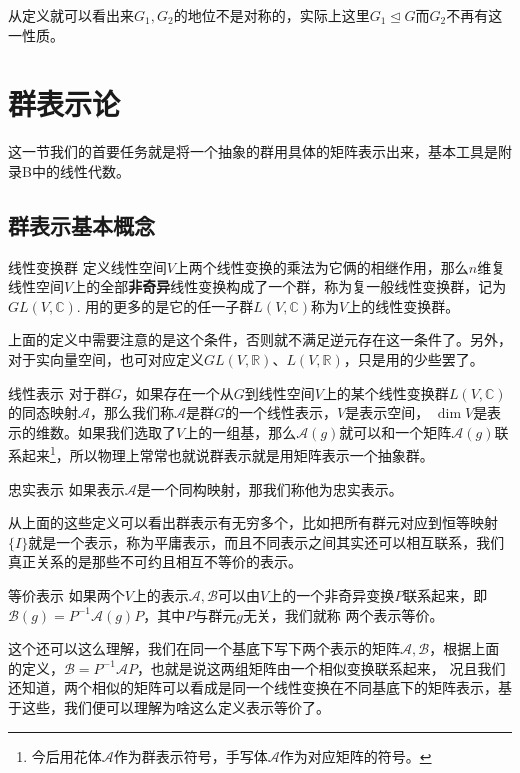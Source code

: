 从定义就可以看出来$G_1,G_2$的地位不是对称的，实际上这里$G_1\unlhd G$而$G_2$不再有这一性质。

\section{群表示论}
这一节我们的首要任务就是将一个抽象的群用具体的矩阵表示出来，基本工具是附录B中的线性代数。
\subsection{群表示基本概念}
\begin{define}{线性变换群}
    定义线性空间$V$上两个线性变换的乘法为它俩的相继作用，那么$n$维复线性空间$V$上的全部\textbf{非奇异}线性变换构成了一个群，称为复一般线性变换群，记为$GL(V,\mathbb{C})$.
    用的更多的是它的任一子群$L(V,\mathbb{C})$称为$V$上的线性变换群。
\end{define}
上面的定义中需要注意的是这个条件，否则就不满足逆元存在这一条件了。另外，对于实向量空间，也可对应定义$GL(V,\mathbb{R})$、$L(V,\mathbb{R})$，只是用的少些罢了。

\begin{define}{线性表示}
    对于群$G$，如果存在一个从$G$到线性空间$V$上的某个线性变换群$L(V,\mathbb{C})$的同态映射$\mathscr{A}$，那么我们称$\mathscr{A}$是群$G$的一个线性表示，$V$是表示空间，
    $\dim V$是表示的维数。如果我们选取了$V$上的一组基，那么$\mathscr{A}(g)$就可以和一个矩阵$\mathcal{A}(g)$联系起来\footnote[1]{今后用花体$\mathscr{A}$作为群表示符号，手写体$\mathcal{A}$作为对应矩阵的符号。}，所以物理上常常也就说群表示就是用矩阵表示一个抽象群。
\end{define}
\begin{define}{忠实表示}
    如果表示$\mathscr{A}$是一个同构映射，那我们称他为忠实表示。
\end{define}
从上面的这些定义可以看出群表示有无穷多个，比如把所有群元对应到恒等映射$\{I\}$就是一个表示，称为平庸表示，而且不同表示之间其实还可以相互联系，我们真正关系的是那些不可约且相互不等价的表示。
\begin{define}{等价表示}
    如果两个$V$上的表示$\mathscr{A},\mathscr{B}$可以由$V$上的一个非奇异变换$P$联系起来，即$\mathscr{B}(g)=P^{-1}\mathscr{A}(g)P$，其中$P$与群元$g$无关，我们就称
    两个表示等价。
\end{define}
这个还可以这么理解，我们在同一个基底下写下两个表示的矩阵$\mathcal{A},\mathcal{B}$，根据上面的定义，$\mathcal{B}=P^{-1}\mathcal{A}P$，也就是说这两组矩阵由一个相似变换联系起来，
况且我们还知道，两个相似的矩阵可以看成是同一个线性变换在不同基底下的矩阵表示，基于这些，我们便可以理解为啥这么定义表示等价了。

